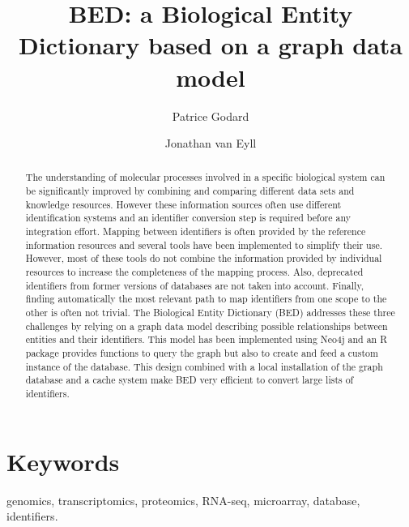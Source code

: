 \documentclass[9pt,a4paper,]{extarticle}
\theoremstyle{definition}
\theoremstyle{definition}
\theoremstyle{definition}
\theoremstyle{remark}
\begin{document}
\pagestyle{front}

\title{BED: a Biological Entity Dictionary based on a graph data model}

\author[1]{Patrice Godard}
\author[2]{Jonathan van Eyll}

\maketitle
\thispagestyle{front}

\begin{abstract}
The understanding of molecular processes involved in a specific biological system can be significantly improved by combining and comparing different data sets and knowledge resources. However these information sources often use different identification systems and an identifier conversion step is required before any integration effort. Mapping between identifiers is often provided by the reference information resources and several tools have been implemented to simplify their use. However, most of these tools do not combine the information provided by individual resources to increase the completeness of the mapping process. Also, deprecated identifiers from former versions of databases are not taken into account. Finally, finding automatically the most relevant path to map identifiers from one scope to the other is often not trivial. The Biological Entity Dictionary (BED) addresses these three challenges by relying on a graph data model describing possible relationships between entities and their identifiers. This model has been implemented using Neo4j and an R package provides functions to query the graph but also to create and feed a custom instance of the database. This design combined with a local installation of the graph database and a cache system make BED very efficient to convert large lists of identifiers.
\end{abstract}

\section*{Keywords}
genomics, transcriptomics, proteomics, RNA-seq, microarray, database, identifiers.


\clearpage
\pagestyle{main}
\end{document}
